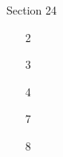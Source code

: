 







Section 24

 \begin{enumerate}

   \item[2] 
   \pagebreak
   \item[3] 
   \pagebreak
   \item[4] 
   \pagebreak
   \item[7] 
   \pagebreak
   \item[8] 

 \end{enumerate}


